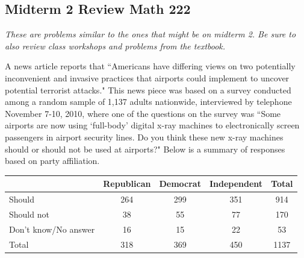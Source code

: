 \documentclass[11pt,answers]{exam}
\begin{document}
\subsection*{Midterm 2 Review \hfill Math 222}

\textit{These are problems similar to the ones that might be on midterm 2. Be sure to also review class workshops and problems from the textbook.}

\begin{questions}


\question A news article reports that ``Americans have differing views
on two potentially inconvenient and invasive practices that airports could implement to uncover
potential terrorist attacks." This news piece was based on a survey conducted among a random
sample of 1{,}137 adults nationwide, interviewed by telephone November 7-10, 2010, where one of
the questions on the survey was ``Some airports are now using `full-body' digital x-ray machines to
electronically screen passengers in airport security lines. Do you think these new x-ray machines
should or should not be used at airports?" Below is a summary of responses based on party
affiliation.

\begin{center}
\begin{tabular}{l|ccc|c} 
~ & Republican & Democrat & Independent & Total \\ \hline
Should & 264 & 299 & 351 & 914 \\ 
Should not & 38 & 55 & 77 & 170 \\ 
Don't know/No answer & 16 & 15 & 22 & 53 \\  \hline
Total & 318 & 369 & 450 & 1137
\end{tabular}
\end{center}



\end{questions}
\end{document}

